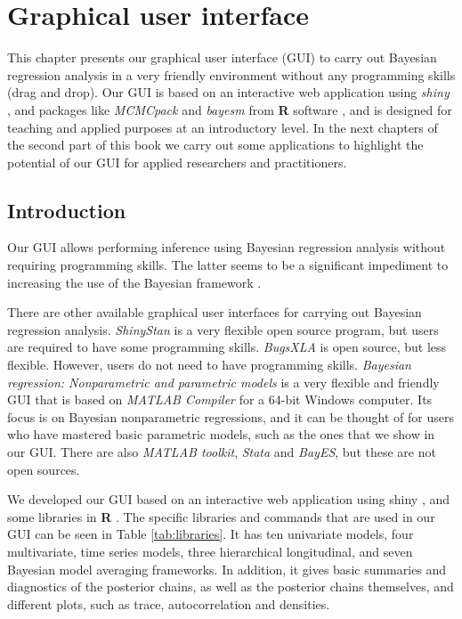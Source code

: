\chapter{Graphical user interface}\label{chapGUI}

This chapter presents our graphical user interface (GUI) to carry out Bayesian regression analysis in a very friendly environment without any programming skills (drag and drop). Our GUI is based on an interactive web application using \textit{shiny} \cite{Chang2018}, and packages like \textit{MCMCpack} \cite{Martin2018} and \textit{bayesm} \cite{Rossi2017} from \textbf{R} software \cite{R2023}, and is designed for teaching and applied purposes at an introductory level. In the next chapters of the second part of this book we carry out some applications to highlight the potential of our GUI for applied researchers and practitioners.

\section{Introduction}\label{secGUI1}

Our GUI allows performing inference using Bayesian regression analysis without requiring programming skills. The latter seems to be a significant impediment to increasing the use of the Bayesian framework \cite{Woodward2005,Karabatsos2016}.

There are other available graphical user interfaces for carrying out Bayesian regression analysis. \textit{ShinyStan} \cite{shinystan2017} is a very flexible open source program, but users are required to have some programming skills. \textit{BugsXLA} \cite{Woodward2005} is open source, but less flexible. However, users do not need to have programming skills. \textit{Bayesian regression: Nonparametric and parametric models} \cite{Karabatsos2016} is a very flexible and friendly GUI that is based on \textit{MATLAB Compiler} for a 64-bit Windows computer. Its focus is on Bayesian nonparametric regressions, and it can be thought of for users who have mastered basic parametric models, such as the ones that we show in our GUI. There are also \textit{MATLAB toolkit}, \textit{Stata} and \textit{BayES}, but these are not open sources.

We developed our GUI based on an interactive web application using shiny \cite{Chang2018}, and some libraries in \textbf{R} \cite{R2021}. The specific libraries and commands that are used in our GUI can be seen in Table \ref{tab:libraries}. It has ten univariate models, four multivariate, {\color{red}time series models}, three hierarchical longitudinal, and seven Bayesian model averaging frameworks. In addition, it gives basic summaries and diagnostics of the posterior chains, as well as the posterior chains themselves, and different plots, such as trace, autocorrelation and densities. 

